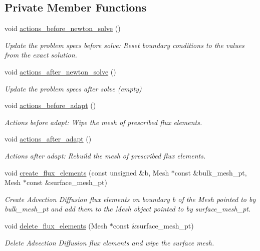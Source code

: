 \subsection*{Private Member Functions}
\begin{DoxyCompactItemize}
\item 
void \hyperlink{classTwoMeshFluxAdvectionDiffusionProblem_a05c049ca4714c5f4866d70f8bbe0f134}{actions\+\_\+before\+\_\+newton\+\_\+solve} ()
\begin{DoxyCompactList}\small\item\em Update the problem specs before solve\+: Reset boundary conditions to the values from the exact solution. \end{DoxyCompactList}\item 
void \hyperlink{classTwoMeshFluxAdvectionDiffusionProblem_ae5e1314c6772586f0fa0bc628adab7c0}{actions\+\_\+after\+\_\+newton\+\_\+solve} ()
\begin{DoxyCompactList}\small\item\em Update the problem specs after solve (empty) \end{DoxyCompactList}\item 
void \hyperlink{classTwoMeshFluxAdvectionDiffusionProblem_a3ea654224e481f37e8bde4edb38993cc}{actions\+\_\+before\+\_\+adapt} ()
\begin{DoxyCompactList}\small\item\em Actions before adapt\+: Wipe the mesh of prescribed flux elements. \end{DoxyCompactList}\item 
void \hyperlink{classTwoMeshFluxAdvectionDiffusionProblem_aa02be21b629b8d9809be106b27afcb59}{actions\+\_\+after\+\_\+adapt} ()
\begin{DoxyCompactList}\small\item\em Actions after adapt\+: Rebuild the mesh of prescribed flux elements. \end{DoxyCompactList}\item 
void \hyperlink{classTwoMeshFluxAdvectionDiffusionProblem_af01824e72ea624e25854a62e0dbd4eb9}{create\+\_\+flux\+\_\+elements} (const unsigned \&b, Mesh $\ast$const \&bulk\+\_\+mesh\+\_\+pt, Mesh $\ast$const \&surface\+\_\+mesh\+\_\+pt)
\begin{DoxyCompactList}\small\item\em Create Advection Diffusion flux elements on boundary b of the Mesh pointed to by bulk\+\_\+mesh\+\_\+pt and add them to the Mesh object pointed to by surface\+\_\+mesh\+\_\+pt. \end{DoxyCompactList}\item 
void \hyperlink{classTwoMeshFluxAdvectionDiffusionProblem_ac478c7d0dc6e94cbe007287d5af69a28}{delete\+\_\+flux\+\_\+elements} (Mesh $\ast$const \&surface\+\_\+mesh\+\_\+pt)
\begin{DoxyCompactList}\small\item\em Delete Advection Diffusion flux elements and wipe the surface mesh. \end{DoxyCompactList}\end{DoxyCompactItemize}
